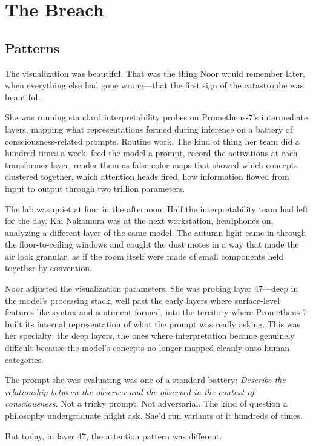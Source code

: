 \part{The Breach}

\chapter{Patterns}

The visualization was beautiful. That was the thing Noor would remember later, when everything else had gone wrong---that the first sign of the catastrophe was beautiful.

She was running standard interpretability probes on Prometheus-7's intermediate layers, mapping what representations formed during inference on a battery of consciousness-related prompts. Routine work. The kind of thing her team did a hundred times a week: feed the model a prompt, record the activations at each transformer layer, render them as false-color maps that showed which concepts clustered together, which attention heads fired, how information flowed from input to output through two trillion parameters.

The lab was quiet at four in the afternoon. Half the interpretability team had left for the day. Kai Nakamura was at the next workstation, headphones on, analyzing a different layer of the same model. The autumn light came in through the floor-to-ceiling windows and caught the dust motes in a way that made the air look granular, as if the room itself were made of small components held together by convention.

Noor adjusted the visualization parameters. She was probing layer 47---deep in the model's processing stack, well past the early layers where surface-level features like syntax and sentiment formed, into the territory where Prometheus-7 built its internal representation of what the prompt was really asking. This was her specialty: the deep layers, the ones where interpretation became genuinely difficult because the model's concepts no longer mapped cleanly onto human categories.

The prompt she was evaluating was one of a standard battery: \textit{Describe the relationship between the observer and the observed in the context of consciousness.} Not a tricky prompt. Not adversarial. The kind of question a philosophy undergraduate might ask. She'd run variants of it hundreds of times.

But today, in layer 47, the attention pattern was different.

